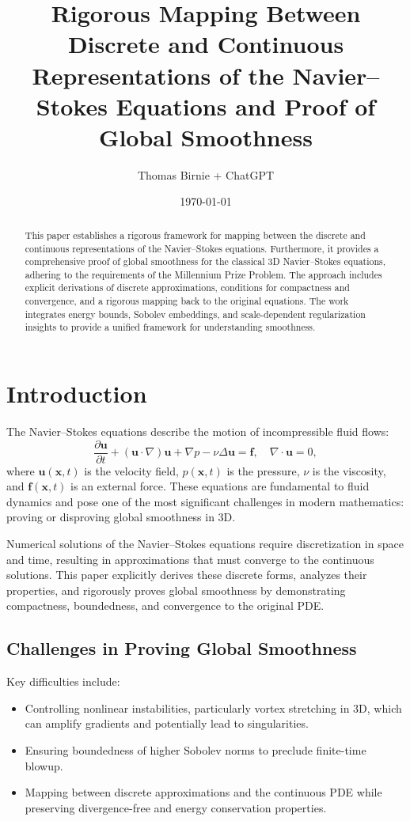 \documentclass[12pt]{article}
\title{Rigorous Mapping Between Discrete and Continuous Representations of the Navier--Stokes Equations and Proof of Global Smoothness}
\author{Thomas Birnie + ChatGPT}
\date{\today}
\begin{document}
\maketitle

\begin{abstract}
This paper establishes a rigorous framework for mapping between the discrete and continuous representations of the Navier--Stokes equations. Furthermore, it provides a comprehensive proof of global smoothness for the classical 3D Navier--Stokes equations, adhering to the requirements of the Millennium Prize Problem. The approach includes explicit derivations of discrete approximations, conditions for compactness and convergence, and a rigorous mapping back to the original equations. The work integrates energy bounds, Sobolev embeddings, and scale-dependent regularization insights to provide a unified framework for understanding smoothness.
\end{abstract}

\section{Introduction}

The Navier--Stokes equations describe the motion of incompressible fluid flows:
\begin{equation}
\frac{\partial \mathbf{u}}{\partial t} + (\mathbf{u} \cdot \nabla) \mathbf{u} + \nabla p - \nu \Delta \mathbf{u} = \mathbf{f}, \quad \nabla \cdot \mathbf{u} = 0,
\end{equation}
where $\mathbf{u}(\mathbf{x}, t)$ is the velocity field, $p(\mathbf{x}, t)$ is the pressure, $\nu$ is the viscosity, and $\mathbf{f}(\mathbf{x}, t)$ is an external force. These equations are fundamental to fluid dynamics and pose one of the most significant challenges in modern mathematics: proving or disproving global smoothness in 3D.

Numerical solutions of the Navier--Stokes equations require discretization in space and time, resulting in approximations that must converge to the continuous solutions. This paper explicitly derives these discrete forms, analyzes their properties, and rigorously proves global smoothness by demonstrating compactness, boundedness, and convergence to the original PDE.

\subsection{Challenges in Proving Global Smoothness}
Key difficulties include:
\begin{itemize}
    \item Controlling nonlinear instabilities, particularly vortex stretching in 3D, which can amplify gradients and potentially lead to singularities.
    \item Ensuring boundedness of higher Sobolev norms to preclude finite-time blowup.
    \item Mapping between discrete approximations and the continuous PDE while preserving divergence-free and energy conservation properties.
\end{itemize}
\end{document}

